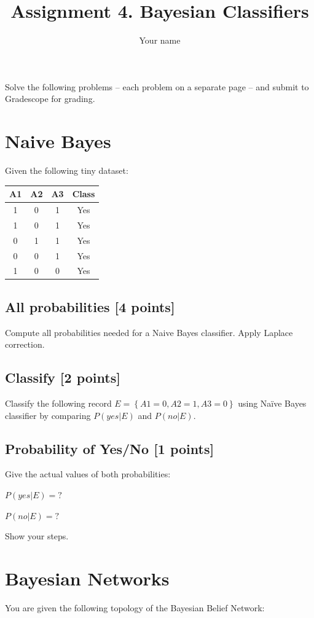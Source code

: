 \documentclass{article}
\title{Assignment 4. Bayesian Classifiers}
\author{Your name}
\begin{document}
\maketitle


Solve the following problems -- each problem on a separate page -- and submit to Gradescope for grading. 

\newpage
\section{Naive Bayes}
Given the following tiny dataset:

\begin{center}
\begin{tabular}{ |c|c|c|c| } 
 \hline
 A1 & A2 & A3 & Class \\
 \hline
1 & 0 & 1 & Yes \\ 
1 & 0 & 1 & Yes \\ 
0 & 1 & 1 & Yes \\ 
0 & 0 & 1 & Yes \\ 
1 & 0 & 0 & Yes \\ 
 \hline
\end{tabular}
\end{center}
\subsection {All probabilities [4 points]}
Compute all probabilities needed for a Naive Bayes classifier. Apply Laplace correction.
\subsection {Classify [2 points]}
Classify the following record $E=\left\{A1=0, A2=1, A3=0\right\}$ using Naïve Bayes classifier by comparing $P(yes|E)$ and $P(no|E)$.
\subsection {Probability of Yes/No [1 points]}
Give the actual values of both probabilities:

$P(yes|E) = ?$ 

$P(no| E) = ?$


Show your steps.

\newpage
\section{Bayesian Networks}
You are given the following topology of the Bayesian Belief Network:
\end{document}
